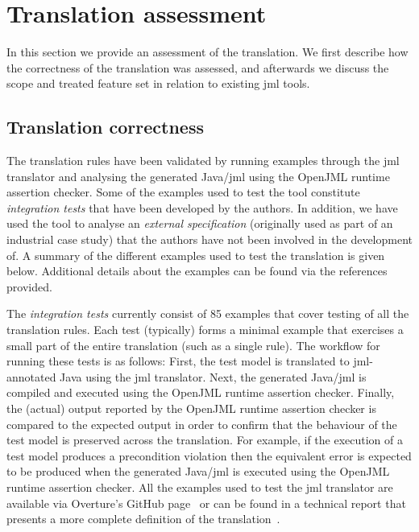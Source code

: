 
\section{Translation assessment}
\label{sec:assess}

In this section we provide an assessment of the translation. We first
describe how the correctness of the translation was assessed, and
afterwards we discuss the scope and treated feature set in relation to
existing \ac{jml} tools.

\subsection{Translation correctness}

The translation rules have been validated by running examples through
the \ac{jml} translator and analysing the generated Java/\ac{jml}
using the OpenJML runtime assertion checker. Some of the examples used
to test the tool constitute \emph{integration tests} that have been
developed by the authors. In addition, we have used the tool to
analyse an \emph{external specification} (originally used as part of
an industrial case study) that the authors have not been involved in
the development of. A summary of the different examples used to test
the translation is given below. Additional details about the examples
can be found via the references provided.

The \emph{integration tests} currently consist of 85 examples that
cover testing of all the translation rules. Each test (typically)
forms a minimal example that exercises a small part of the entire
translation (such as a single rule). The workflow for running these
tests is as follows: First, the test model is translated to
\ac{jml}-annotated Java using the \ac{jml} translator. Next, the
generated Java/\ac{jml} is compiled and executed using the OpenJML
runtime assertion checker. Finally, the (actual) output reported by
the OpenJML runtime assertion checker is compared to the expected
output in order to confirm that the behaviour of the test model is
preserved across the translation. For example, if the execution of a
test model produces a precondition violation then the equivalent error
is expected to be produced when the generated Java/\ac{jml} is
executed using the OpenJML runtime assertion checker. All the examples
used to test the \ac{jml} translator are available via Overture's
GitHub page~\cite{OvertureGithub} or can be found in a technical
report that presents a more complete definition of the
translation~\cite{JmlTechReport16}.

